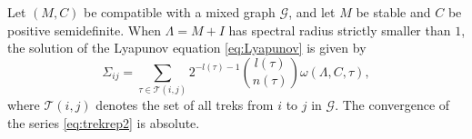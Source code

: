 \documentclass[10pt,twoside,a4paper]{amsart}
\begin{document}
\begin{proposition}  \label{prop:trek}
    Let $(M, C)$ be compatible with a mixed graph $\mathcal{G}$, and let $M$ 
    be stable and $C$ be positive semidefinite. When $\Lambda = M + I$ 
    has spectral radius strictly smaller than $1$, the solution of the Lyapunov
    equation \eqref{eq:Lyapunov} is given by
    \begin{equation} \label{eq:trekrep2}
        \Sigma_{ij} = \sum_{\tau \in \mathcal{T}(i,j)} 
        2^{-l(\tau) - 1}
        {l(\tau) \choose n(\tau)}
        \omega(\Lambda, C, \tau),
    \end{equation}
     where $\mathcal{T}(i,j)$ denotes the set of all treks from $i$ to
    $j$ in $\mathcal{G}$. The convergence of the series \eqref{eq:trekrep2} is absolute.  
\end{proposition}
\end{document}

